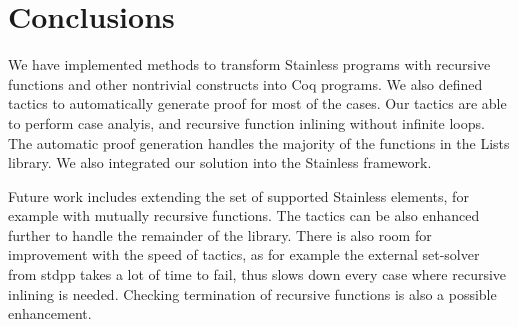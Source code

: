 \section{Conclusions}

We have implemented methods to transform Stainless programs with recursive functions and other nontrivial constructs into Coq programs. We also defined tactics to automatically generate proof for most of the cases. Our tactics are able to perform case analyis, and recursive function inlining without infinite loops. The automatic proof generation handles the majority of the functions in the Lists library. We also integrated our solution into the Stainless framework.

Future work includes extending the set of supported Stainless elements, for example with mutually recursive functions. The tactics can be also enhanced further to handle the remainder of the library. There is also room for improvement with the speed of tactics, as for example the external set-solver from stdpp takes a lot of time to fail, thus slows down every case where recursive inlining is needed. Checking termination of recursive functions is also a possible enhancement.